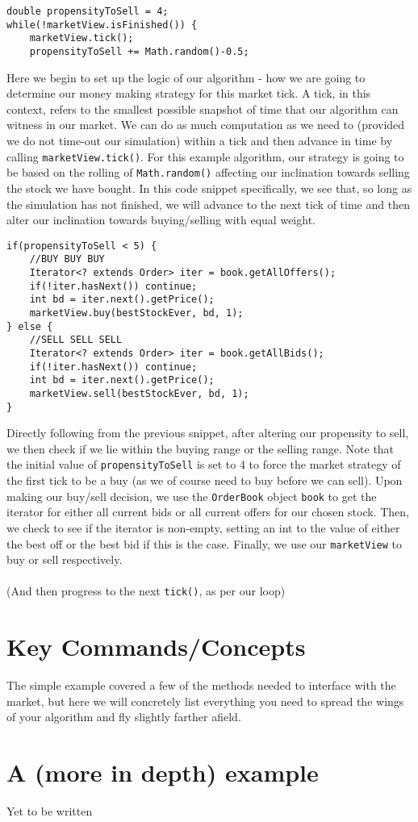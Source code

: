 \documentclass[11pt]{article}
\begin{document}
\begin{lstlisting}
double propensityToSell = 4;
while(!marketView.isFinished()) {
	marketView.tick();
	propensityToSell += Math.random()-0.5;
\end{lstlisting}
Here we begin to set up the logic of our algorithm - how we are going to determine our money making strategy for this market tick. A tick, in this context, refers to the smallest possible snapshot of time that our algorithm can witness in our market. We can do as much computation as we need to (provided we do not time-out our simulation) within a tick and then advance in time by calling \texttt{marketView.tick()}. For this example algorithm, our strategy is going to be based on the rolling of \texttt{Math.random()} affecting our inclination towards selling the stock we have bought. In this code snippet specifically, we see that, so long as the simulation has not finished, we will advance to the next tick of time and then alter our inclination towards buying/selling with equal weight.\\

\begin{lstlisting}
if(propensityToSell < 5) {
	//BUY BUY BUY
	Iterator<? extends Order> iter = book.getAllOffers();
	if(!iter.hasNext()) continue;
	int bd = iter.next().getPrice();
	marketView.buy(bestStockEver, bd, 1);
} else {
	//SELL SELL SELL
	Iterator<? extends Order> iter = book.getAllBids();
	if(!iter.hasNext()) continue;
	int bd = iter.next().getPrice();
	marketView.sell(bestStockEver, bd, 1);
}
\end{lstlisting}
Directly following from the previous snippet, after altering our propensity to sell, we then check if we lie within the buying range or the selling range. Note that the initial value of \texttt{propensityToSell} is set to 4 to force the market strategy of the first tick to be a buy (as we of course need to buy before we can sell). Upon making our buy/sell decision, we use the \texttt{OrderBook} object \texttt{book} to get the iterator for either all current bids or all current offers for our chosen stock. Then, we check to see if the iterator is non-empty, setting an int to the value of either the best off or the best bid if this is the case. Finally, we use our \texttt{marketView} to buy or sell respectively.\\\\(And then progress to the next \texttt{tick()}, as per our loop)

\section{Key Commands/Concepts}
The simple example covered a few of the methods needed to interface with the market, but here we will concretely list everything you need to spread the wings of your algorithm and fly slightly farther afield.
\section{A (more in depth) example}
Yet to be written
\end{document}
